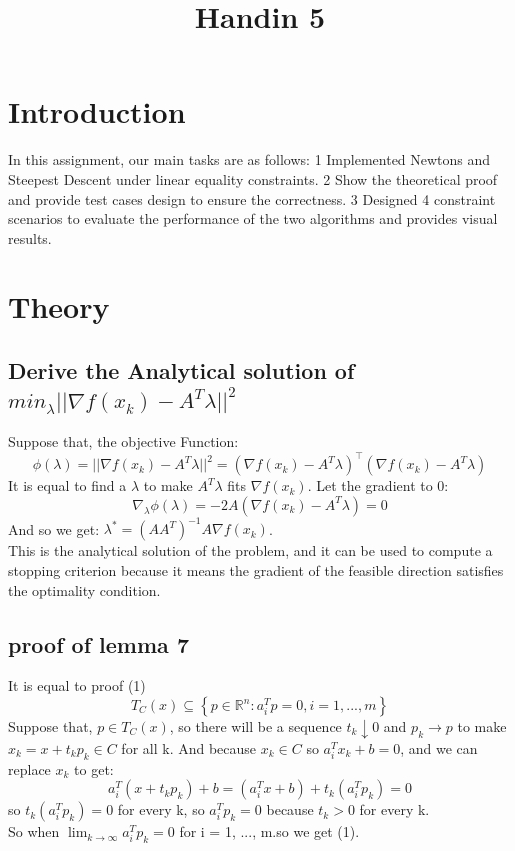 \documentclass[12pt]{article}
\title{Handin 5}
\begin{document}
\maketitle

\section{Introduction}
In this assignment, our main tasks are as follows: 1 Implemented Newtons and Steepest Descent under linear equality constraints.
2 Show the theoretical proof and provide test cases design to ensure the correctness.
3 Designed 4 constraint scenarios to evaluate the performance of the two algorithms and provides visual results.
\section{Theory}
\subsection{Derive the Analytical solution of $min_{\lambda}||\nabla f(x_k) - A^T \lambda ||^2$}

Suppose that, the objective Function: 
\[
\phi (\lambda) = ||\nabla f(x_k) - A^T \lambda ||^2 = (\nabla f(x_k) - A^T\lambda )^\top(\nabla f(x_k) - A^T\lambda)
\]
It is equal to find a $\lambda$ to make $A^T \lambda$ fits $\nabla f(x_k)$.
 Let the gradient to 0:
 \[
 \nabla_\lambda \phi(\lambda) = -2A(\nabla f(x_k) - A^T\lambda) = 0
 \]
 And so we get: $\lambda^* = (AA^T)^{-1}A\nabla f(x_k)$.\\
This is the analytical solution of the problem, and it can be used to compute a stopping criterion because it means the gradient of the feasible direction satisfies the optimality condition.
\subsection{proof of lemma 7}
It is equal to proof (1) 
\[
T_C(x) \subseteq \left\{p\in \mathbb{R}^n : a_i^T p = 0, i = 1, ..., m\right\}
\]
Suppose that, $p \in T_C(x)$, so there will be a sequence $t_k \downarrow 0$ and $p_k \rightarrow p$ to make $x_k = x + t_kp_k \in C$ for all k.
And because $x_k \in C$ so $a_i^T x_k + b = 0$, and we can replace $x_k$ to get:
\[
a_i^T(x + t_kp_k) + b = (a^T_ix + b) + t_k(a_i^Tp_k) = 0
\]
so $t_k(a_i^Tp_k) = 0$ for every k, so $a_i^Tp_k = 0$ because $t_k > 0$ for every k. \\
So when $\lim_{k \rightarrow \infty} a^T_ip_k = 0$ for i = 1, ..., m.so we get (1).\\
\end{document}
